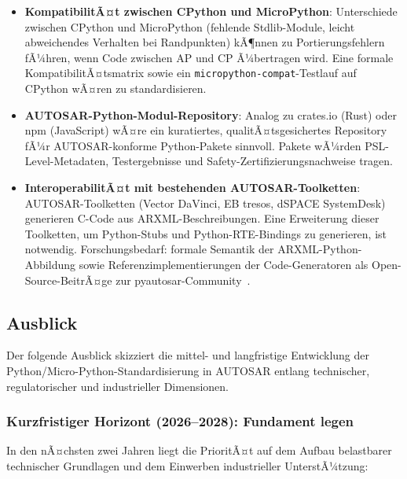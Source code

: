 ﻿\documentclass[12pt,a4paper,twoside]{article}
\begin{document}
\begin{itemize}
  \item \textbf{KompatibilitÃ¤t zwischen CPython und MicroPython}:
        Unterschiede zwischen CPython und MicroPython (fehlende Stdlib-Module,
        leicht abweichendes Verhalten bei Randpunkten) kÃ¶nnen zu Portierungsfehlern
        fÃ¼hren, wenn Code zwischen AP und CP Ã¼bertragen wird.
        Eine formale KompatibilitÃ¤tsmatrix sowie ein
        \texttt{micropython-compat}-Testlauf auf CPython wÃ¤ren zu standardisieren.

  \item \textbf{AUTOSAR-Python-Modul-Repository}:
        Analog zu crates.io (Rust) oder npm (JavaScript) wÃ¤re ein
        kuratiertes, qualitÃ¤tsgesichertes Repository fÃ¼r AUTOSAR-konforme
        Python-Pakete sinnvoll.
        Pakete wÃ¼rden PSL-Level-Metadaten, Testergebnisse und
        Safety-Zertifizierungsnachweise tragen.

  \item \textbf{InteroperabilitÃ¤t mit bestehenden AUTOSAR-Toolketten}:
        AUTOSAR-Toolketten (Vector DaVinci, EB tresos, dSPACE SystemDesk)
        generieren C-Code aus ARXML-Beschreibungen.
        Eine Erweiterung dieser Toolketten, um Python-Stubs und
        Python-RTE-Bindings zu generieren, ist notwendig.
        Forschungsbedarf: formale Semantik der ARXML-Python-Abbildung
        sowie Referenzimplementierungen der Code-Generatoren als
        Open-Source-BeitrÃ¤ge zur pyautosar-Community~\cite{pyautosar_gh}.
\end{itemize}

\subsection{Ausblick}
\label{subsec:ausblick}

Der folgende Ausblick skizziert die mittel- und langfristige Entwicklung
der Python/Micro-\newline Python-Standardisierung in AUTOSAR entlang technischer,
regulatorischer und industrieller Dimensionen.

\subsubsection{Kurzfristiger Horizont (2026--2028): Fundament legen}

In den nÃ¤chsten zwei Jahren liegt die PrioritÃ¤t auf dem Aufbau belastbarer
technischer Grundlagen und dem Einwerben industrieller UnterstÃ¼tzung:
\end{document}
